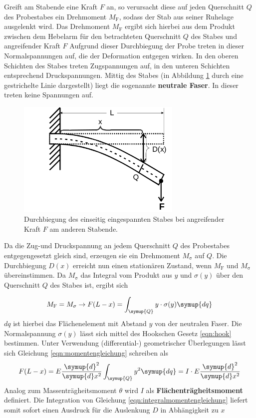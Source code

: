 Greift am Stabende eine Kraft $F$ an, so verursacht diese auf jeden Querschnitt $Q$ des Probestabes ein Drehmoment $M_{\mathrm{F}}$, sodass der Stab aus seiner Ruhelage ausgelenkt wird. Das Drehmoment $M_{\mathrm{F}}$ ergibt sich hierbei aus dem Produkt zwischen dem Hebelarm für den betrachteten Querschnitt $Q$ des Stabes und angreifender Kraft $F$
Aufgrund dieser Durchbiegung der Probe treten in dieser Normalspannungen auf, die der Deformation entgegen wirken.
In den oberen Schichten des Stabes treten Zugspannungen auf, in den unteren Schichten entsprechend Druckspannungen.
Mittig des Stabes (in Abbildung \ref{fig:Durchbiegung} durch eine gestrichelte Linie dargestellt) liegt die sogenannte \textbf{neutrale Faser}. In dieser treten keine Spannungen auf.
\begin{figure}
	\centering
	\includegraphics[width=0.7\textwidth]{Bilder/durchbiegungstab.png}
	\caption{Durchbiegung des einseitig eingespannten Stabes bei angreifender Kraft $F$ am anderen Stabende. \cite{Anleitung}}
	\label{fig:Durchbiegung}
\end{figure}
Da die Zug-und Druckspannung an jedem Querschnitt $Q$ des Probestabes entgegengesetzt gleich sind, erzeugen sie ein Drehmoment $M_{\mathrm{\sigma}}$ auf $Q$.
Die Durchbiegung $D(x)$ erreicht nun einen stationären Zustand, wenn $M_{\mathrm{F}}$ und $M_{\mathrm{\sigma}}$ übereinstimmen.
Da $M_{\mathrm{\sigma}}$ das Integral vom Produkt aus $y$ und $\sigma(y)$ über den Querschnitt $Q$ des Stabes ist, ergibt sich

\begin{equation}
	\label{eqn:momentengleichung}
	M_{\mathrm{F}}=M_{\mathrm{\sigma}} \rightarrow F(L-x)=\int_{\symup{Q}}^{} y \cdot \sigma(y) \symup{dq}
\end{equation}
$dq$ ist hierbei das Flächenelement mit Abstand $y$ von der neutralen Faser.
Die Normalspannung $\sigma(y)$ lässt sich mittel des Hookschen Gesetz \eqref{eqn:hook} bestimmen.
Unter Verwendung (differential-) geometrischer Überlegungen lässt sich Gleichung \eqref{eqn:momentengleichung} schreiben als
\begin{equation}
	\label{eqn:integralmomentengleichung}
	F(L-x)=E \frac{\symup{d}^2}{\symup{d}x^2} \int_{\symup{Q}}^{} y^2 \symup{dq}=I \cdot E \frac{\symup{d}^2}{\symup{d}x^2}
\end{equation}
Analog zum Massenträgheitsmoment $\theta$ wird $I$ als \textbf{Flächenträgheitsmoment} definiert.
Die Integration von Gleichung  \eqref{eqn:integralmomentengleichung} liefert somit sofort einen Ausdruck für die Auslenkung $D$ in Abhängigkeit zu $x$


